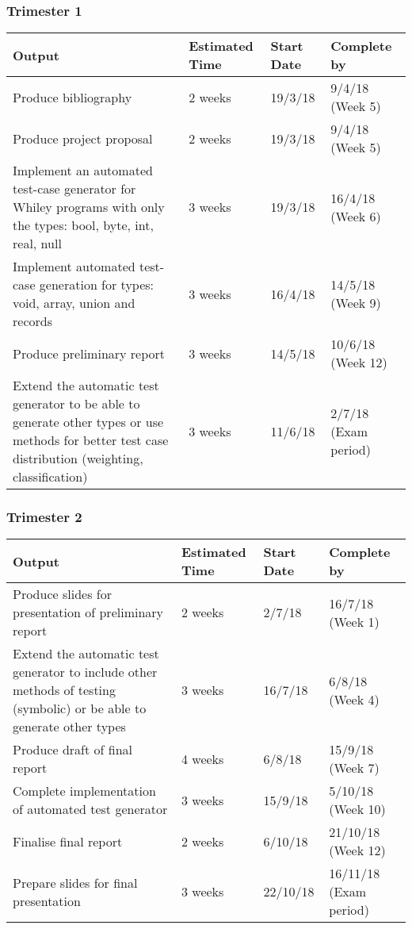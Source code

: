 \documentclass[11pt, a4paper, twoside, openright]{report}
\begin{document}
\subsubsection*{Trimester 1}
\begin{tabular}{ |p{10cm}|p{2cm}|p{2cm}|p{2cm}| }
	\hline
	\textbf{Output} & \textbf{Estimated Time} &
	\textbf{Start Date} & \textbf{Complete by}\\
	\hline
	Produce bibliography & 2 weeks & 19/3/18
	& 9/4/18 (Week 5) \\
	\hline
	Produce project proposal & 2 weeks & 19/3/18 & 9/4/18 (Week 5) \\
	\hline
	Implement an automated test-case generator for Whiley programs with only the types:  bool, byte, int, real, null & 3 weeks & 19/3/18 & 16/4/18 (Week 6) \\
	
	\hline
	Implement automated test-case generation for types: void, array, union and records & 3 weeks & 16/4/18 & 14/5/18 (Week 9) \\
	\hline
	Produce preliminary report & 3 weeks & 14/5/18 & 10/6/18 (Week 12) \\	
	\hline
	Extend the automatic test generator to be able to generate other types or use methods for better test case distribution (weighting, classification) & 3 weeks & 11/6/18 & 2/7/18 (Exam period) \\
	\hline
\end{tabular}

\subsubsection*{Trimester 2}
\begin{tabular}{ |p{10cm}|p{3cm}|p{2cm}|p{2cm}| }
	\hline
	\textbf{Output} & \textbf{Estimated Time} & \textbf{Start Date} & \textbf{Complete by}\\
	\hline
	Produce slides for presentation of preliminary report & 2 weeks & 2/7/18 & 16/7/18 (Week 1)\\
	\hline
	Extend the automatic test generator to include other methods of testing (symbolic) or be able to generate other types & 3 weeks & 16/7/18 & 6/8/18 (Week 4)\\
	\hline
	Produce draft of final report & 4 weeks & 6/8/18 & 15/9/18 (Week 7)\\
	\hline
	Complete implementation of automated test generator & 3 weeks & 15/9/18 & 5/10/18 (Week 10) \\
	\hline
	Finalise final report & 2 weeks & 6/10/18 & 21/10/18 (Week 12) \\
	\hline
	Prepare slides for final presentation & 3 weeks & 22/10/18 & 16/11/18 (Exam period)\\
	\hline
\end{tabular}
\end{document}
